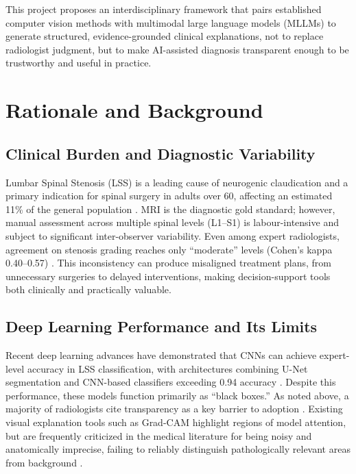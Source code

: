 \documentclass[12pt]{article}
\begin{document}
This project proposes an interdisciplinary framework that pairs established computer vision methods with multimodal large language models (MLLMs) to generate structured, evidence-grounded clinical explanations, not to replace radiologist judgment, but to make AI-assisted diagnosis transparent enough to be trustworthy and useful in practice.

\section{Rationale and Background}
\subsection{Clinical Burden and Diagnostic Variability}
Lumbar Spinal Stenosis (LSS) is a leading cause of neurogenic claudication and a primary indication for spinal surgery in adults over 60, affecting an estimated 11\% of the general population \citep{Munakomi2023}. MRI is the diagnostic gold standard; however, manual assessment across multiple spinal levels (L1–S1) is labour-intensive and subject to significant inter-observer variability. Even among expert radiologists, agreement on stenosis grading reaches only “moderate” levels (Cohen’s kappa 0.40–0.57) \citep{AlTameemi2017, Holc2023}. This inconsistency can produce misaligned treatment plans, from unnecessary surgeries to delayed interventions, making decision-support tools both clinically and practically valuable.

\subsection{Deep Learning Performance and Its Limits}
Recent deep learning advances have demonstrated that CNNs can achieve expert-level accuracy in LSS classification, with architectures combining U-Net segmentation and CNN-based classifiers exceeding 0.94 accuracy \citep{Liu2025}. Despite this performance, these models function primarily as “black boxes.” As noted above, a majority of radiologists cite transparency as a key barrier to adoption \citep{aravazhi2024}. Existing visual explanation tools such as Grad-CAM highlight regions of model attention, but are frequently criticized in the medical literature for being noisy and anatomically imprecise, failing to reliably distinguish pathologically relevant areas from background \citep{Houssein2025, Muhammad2024}.
\end{document}
